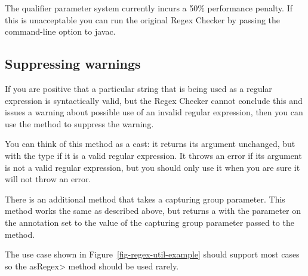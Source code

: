 \begin{sloppypar}
The qualifier parameter system currently
incurs a 50\%
performance penalty. If this is unacceptable you can run the original Regex
Checker by passing the
command-line option to javac.
\end{sloppypar}


\subsection{Suppressing warnings\label{regex-suppressing-warnings}}

If you are positive that a particular string that is being used as a
regular expression is syntactically valid, but the Regex Checker cannot
conclude this and issues a warning about possible use of an invalid regular
expression, then you can use the
 method to suppress the
warning.

You can think of this method
as a cast:  it returns its argument unchanged, but with the type
 if it is a valid regular expression.  It throws an
error if its argument is not a valid regular expression, but you should
only use it when you are sure it will not throw an error.

There is an additional 
method that takes a capturing group parameter. This method works the same as
described above, but returns a  with the parameter on the
annotation set to the value of the capturing group parameter passed to the method.

The use case shown in Figure~\ref{fig-regex-util-example} should support most cases
so the \<asRegex> method should be used rarely.




